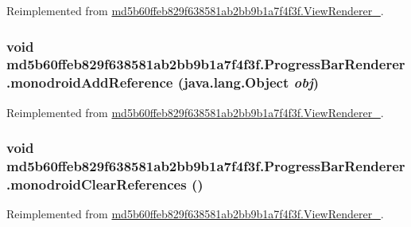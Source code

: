 Reimplemented from \hyperlink{classmd5b60ffeb829f638581ab2bb9b1a7f4f3f_1_1_view_renderer__2_a0898cf56fa9a49b653470eaf1608e77}{md5b60ffeb829f638581ab2bb9b1a7f4f3f.ViewRenderer\_}.\hypertarget{classmd5b60ffeb829f638581ab2bb9b1a7f4f3f_1_1_progress_bar_renderer_202f5798a458806f96e04ca5e9dffe33}{
\subsubsection[{monodroidAddReference}]{\setlength{\rightskip}{0pt plus 5cm}void md5b60ffeb829f638581ab2bb9b1a7f4f3f.ProgressBarRenderer.monodroidAddReference (java.lang.Object {\em obj})}}
\label{classmd5b60ffeb829f638581ab2bb9b1a7f4f3f_1_1_progress_bar_renderer_202f5798a458806f96e04ca5e9dffe33}




Reimplemented from \hyperlink{classmd5b60ffeb829f638581ab2bb9b1a7f4f3f_1_1_view_renderer__2_64ca8244a89f60a47c173d9c0b15d610}{md5b60ffeb829f638581ab2bb9b1a7f4f3f.ViewRenderer\_}.\hypertarget{classmd5b60ffeb829f638581ab2bb9b1a7f4f3f_1_1_progress_bar_renderer_c94ee2b4c29a46b82c4caf81da54a9bc}{
\subsubsection[{monodroidClearReferences}]{\setlength{\rightskip}{0pt plus 5cm}void md5b60ffeb829f638581ab2bb9b1a7f4f3f.ProgressBarRenderer.monodroidClearReferences ()}}
\label{classmd5b60ffeb829f638581ab2bb9b1a7f4f3f_1_1_progress_bar_renderer_c94ee2b4c29a46b82c4caf81da54a9bc}




Reimplemented from \hyperlink{classmd5b60ffeb829f638581ab2bb9b1a7f4f3f_1_1_view_renderer__2_dae20979ac761a65aa60c9b427509c37}{md5b60ffeb829f638581ab2bb9b1a7f4f3f.ViewRenderer\_}.

